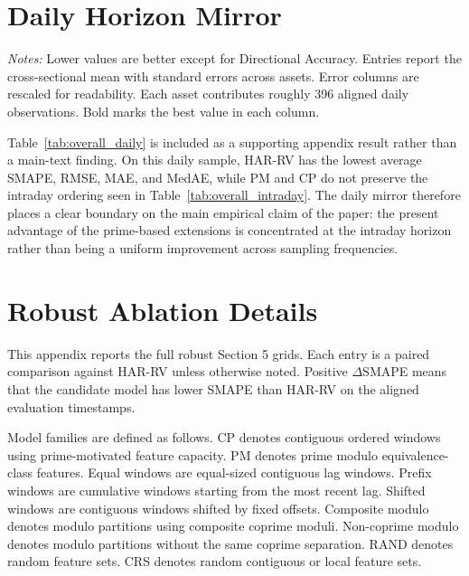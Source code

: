 \documentclass[11pt,a4paper]{article}
\begin{document}
\section{Daily Horizon Mirror}

{\renewcommand{\thetable}{1B}
\begin{center}
\label{tab:overall_daily}
\small
\renewcommand{\arraystretch}{1.15}
\setlength{\tabcolsep}{6pt}
\resizebox{0.98\textwidth}{!}{}

\vspace{0.1cm}
\footnotesize \parbox{0.92\textwidth}{\textit{Notes:} Lower values are better except for Directional Accuracy. Entries report the cross-sectional mean with standard errors across assets. Error columns are rescaled for readability. Each asset contributes roughly 396 aligned daily observations. Bold marks the best value in each column.}
\end{center}}

\noindent
Table~\ref{tab:overall_daily} is included as a supporting appendix result rather than a main-text finding. On this daily sample, HAR-RV has the lowest average SMAPE, RMSE, MAE, and MedAE, while PM and CP do not preserve the intraday ordering seen in Table~\ref{tab:overall_intraday}. The daily mirror therefore places a clear boundary on the main empirical claim of the paper: the present advantage of the prime-based extensions is concentrated at the intraday horizon rather than being a uniform improvement across sampling frequencies.

\section{Robust Ablation Details}

\noindent
This appendix reports the full robust Section 5 grids. Each entry is a paired comparison against HAR-RV unless otherwise noted. Positive $\Delta$SMAPE means that the candidate model has lower SMAPE than HAR-RV on the aligned evaluation timestamps.

\noindent
Model families are defined as follows. CP denotes contiguous ordered windows using prime-motivated feature capacity. PM denotes prime modulo equivalence-class features. Equal windows are equal-sized contiguous lag windows. Prefix windows are cumulative windows starting from the most recent lag. Shifted windows are contiguous windows shifted by fixed offsets. Composite modulo denotes modulo partitions using composite coprime moduli. Non-coprime modulo denotes modulo partitions without the same coprime separation. RAND denotes random feature sets. CRS denotes random contiguous or local feature sets.
\end{document}
